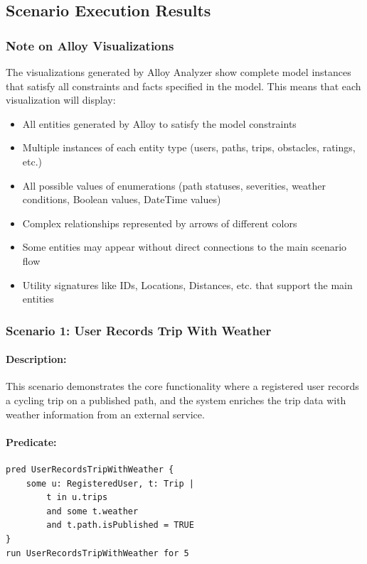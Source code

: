 \newpage

\subsection{Scenario Execution Results}
\label{subsec:scenario_execution}%

\subsubsection*{Note on Alloy Visualizations}

The visualizations generated by Alloy Analyzer show complete model instances that satisfy all constraints and facts specified in the model. This means that each visualization will display:

\begin{itemize}
    \item All entities generated by Alloy to satisfy the model constraints
    \item Multiple instances of each entity type (users, paths, trips, obstacles, ratings, etc.)
    \item All possible values of enumerations (path statuses, severities, weather conditions, Boolean values, DateTime values)
    \item Complex relationships represented by arrows of different colors
    \item Some entities may appear without direct connections to the main scenario flow
    \item Utility signatures like IDs, Locations, Distances, etc. that support the main entities
\end{itemize}

\subsubsection{Scenario 1: User Records Trip With Weather}
\paragraph{Description:} This scenario demonstrates the core functionality where a registered user records a cycling trip on a published path, and the system enriches the trip data with weather information from an external service.

\paragraph{Predicate:}
\begin{verbatim}
pred UserRecordsTripWithWeather {
    some u: RegisteredUser, t: Trip |
        t in u.trips
        and some t.weather
        and t.path.isPublished = TRUE
}
run UserRecordsTripWithWeather for 5
\end{verbatim}

